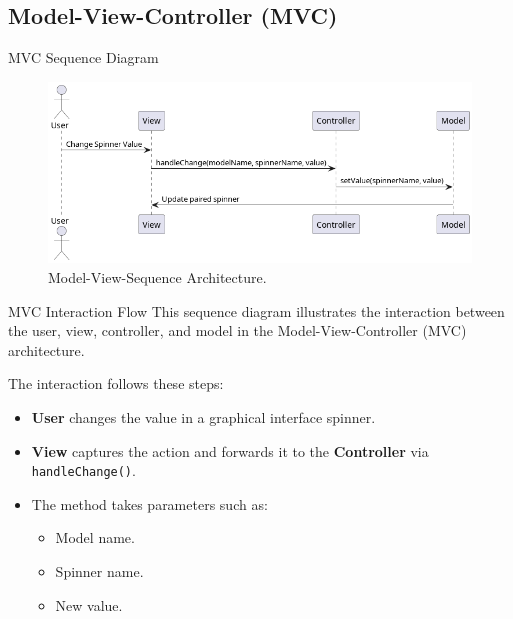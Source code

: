 \documentclass[aspectratio=169, table]{beamer}
\begin{document}
\subsection{Model-View-Controller (MVC)}

\begin{frame}[fragile]{MVC Sequence Diagram}
	\vspace{20pt}
	\begin{figure}[h]
		\centering
		\includegraphics[width=\textwidth]{../images/out/mvc-sequence.png}
		\caption{Model-View-Sequence Architecture.}
		\label{fig:mvc-sequence}
	\end{figure}
\end{frame}

\begin{frame}[fragile]{MVC Interaction Flow}
	\vspace{20pt}
	This sequence diagram illustrates the interaction between the user, view, controller, and model in the Model-View-Controller (MVC) architecture.
	
	The interaction follows these steps:
	\begin{itemize}
		\item \textbf{User} changes the value in a graphical interface spinner.
		\item \textbf{View} captures the action and forwards it to the \textbf{Controller} via \texttt{handleChange()}.
		\item The method takes parameters such as:
		\begin{itemize}
			\item Model name.
			\item Spinner name.
			\item New value.
		\end{itemize}
	\end{itemize}
\end{frame}
\end{document}
